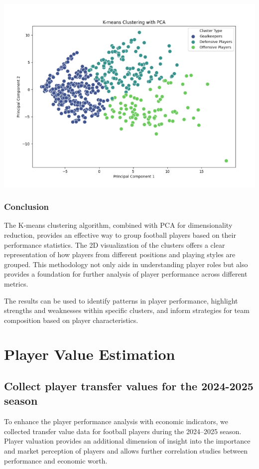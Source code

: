 \documentclass[a4paper,12pt]{article}
\begin{document}
\includegraphics{k_mean.png}
\subsubsection{Conclusion}

The K-means clustering algorithm, combined with PCA for dimensionality reduction, provides an effective way to group football players based on their performance statistics. The 2D visualization of the clusters offers a clear representation of how players from different positions and playing styles are grouped. This methodology not only aids in understanding player roles but also provides a foundation for further analysis of player performance across different metrics.

The results can be used to identify patterns in player performance, highlight strengths and weaknesses within specific clusters, and inform strategies for team composition based on player characteristics.



\newpage
\section{Player Value Estimation}
\subsection{Collect player transfer values for the 2024-2025 season}


To enhance the player performance analysis with economic indicators, we collected transfer value data for football players during the 2024–2025 season. Player valuation provides an additional dimension of insight into the importance and market perception of players and allows further correlation studies between performance and economic worth.
\end{document}
